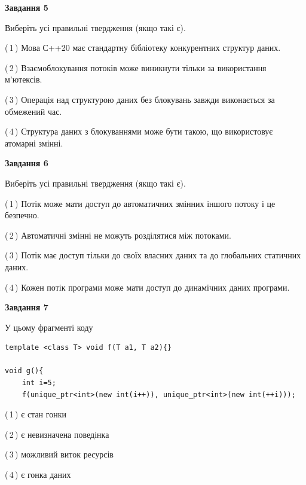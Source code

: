 \documentclass[12pt, ukrainian]{article}
\begin{document}
\begin {large}
{\begin{center}
\textbf{Завдання 5}
\end{center}

Виберіть усі правильні твердження (якщо такі є).\par
\vspace{2mm}

(\,1\,) Мова С++20 має стандартну бібліотеку конкурентних структур даних.%

(\,2\,) Взаємоблокування потоків може виникнути тільки за використання м’ютексів.%

(\,3\,) Операція над структурою даних без блокувань завжди виконається за обмежений час.%

(\,4\,) Структура даних з блокуваннями може бути такою, що використовує атомарні змінні.%
\newpage


\begin{center}
\textbf{Завдання 6}
\end{center}

Виберіть усі правильні твердження (якщо такі є).\par
\vspace{2mm}

(\,1\,) Потік може мати доступ до автоматичних змінних іншого потоку і це безпечно.%

(\,2\,) Автоматичні змінні не можуть розділятися між потоками.%

(\,3\,) Потік має доступ тільки до своїх власних даних та до глобальних статичних даних.%

(\,4\,) Кожен потік програми може мати доступ до динамічних даних програми.%


\begin{center}
\textbf{Завдання 7}
\end{center}

У цьому фрагменті коду
\begin{verbatim}
template <class T> void f(T a1, T a2){}

void g(){
    int i=5;
    f(unique_ptr<int>(new int(i++)), unique_ptr<int>(new int(++i)));
\end{verbatim}

(\,1\,) є стан гонки%

(\,2\,) є невизначена поведінка%

(\,3\,) можливий виток ресурсів%

(\,4\,) є гонка даних%

}
\end {large}

\vspace{4mm}
\newpage
\end{document}
